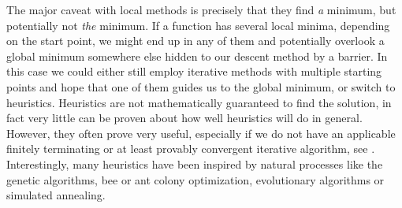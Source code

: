 The major caveat with local methods is precisely that they find \emph{a}
minimum, but potentially not \emph{the} minimum. If a function has several local
minima, depending on the start point, we might end up in any of them and
potentially overlook a global minimum somewhere else hidden to our descent
method by a barrier. In this case we could either still employ iterative methods
with multiple starting points and hope that one of them guides us to the global
minimum, or switch to heuristics. Heuristics are not mathematically guaranteed
to find the solution, in fact very little can be proven about how well
heuristics will do in general. However, they often prove very useful, especially
if we do not have an applicable finitely terminating or at least provably
convergent iterative algorithm, see . Interestingly,
many heuristics have been inspired by natural processes like the genetic
algorithms, bee or ant colony optimization, evolutionary algorithms or simulated
annealing.

